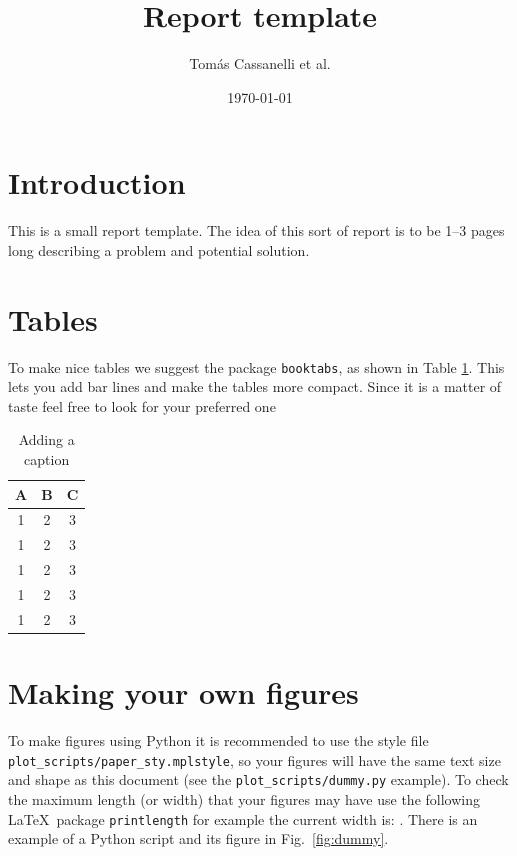 \documentclass[
    10pt,
    a4paper,
    ]{article}
\begin{document}
\title{Report template}
\author{Tom\'{a}s Cassanelli et al.}
\date{\today}

\maketitle

\section{Introduction}
\label{sec:introduction}

This is a small report template. The idea of this sort of report is to be 1--3 pages long describing a problem and potential solution.

\section{Tables}
To make nice tables we suggest the package \texttt{booktabs}, as shown in Table \ref{tab:my_table}. This lets you add bar lines and make the tables more compact. Since it is a matter of taste feel free to look for your preferred one

\begin{table}[t]
    \centering
    \begin{tabular}{ccc}
        \toprule
        \textbf{A} & \textbf{B} & \textbf{C} \\ \midrule
        1 & 2 & 3 \\
        1 & 2 & 3 \\
        1 & 2 & 3 \\
        1 & 2 & 3 \\
        1 & 2 & 3 \\
        \bottomrule
    \end{tabular}
    \caption{Adding a caption}
    \label{tab:my_table}
\end{table}

\section{Making your own figures}

To make figures using Python it is recommended to use the style file \texttt{plot\_scripts/paper\_sty.mplstyle}, so your figures will have the same text size and shape as this document (see the \texttt{plot\_scripts/dummy.py} example).
To check the maximum length (or width) that your figures may have use the following \LaTeX~package \texttt{printlength} for example the current width is: \printlength{\textwidth}. There is an example of a Python script and its figure in Fig.~\ref{fig:dummy}.
 
\end{document}
